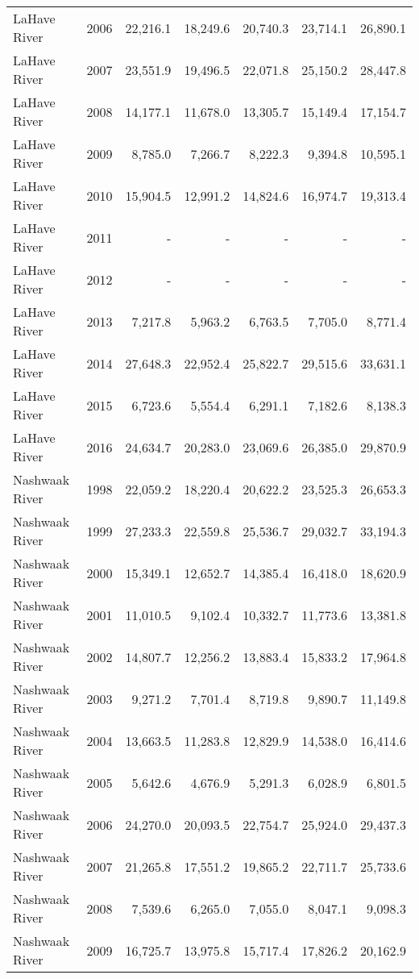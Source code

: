 \begin{longtable}{llrrrrr}
  LaHave River & 2006 & 22,216.1 & 18,249.6 & 20,740.3 & 23,714.1 & 26,890.1 \\ 
  LaHave River & 2007 & 23,551.9 & 19,496.5 & 22,071.8 & 25,150.2 & 28,447.8 \\ 
  LaHave River & 2008 & 14,177.1 & 11,678.0 & 13,305.7 & 15,149.4 & 17,154.7 \\ 
  LaHave River & 2009 & 8,785.0 & 7,266.7 & 8,222.3 & 9,394.8 & 10,595.1 \\ 
  LaHave River & 2010 & 15,904.5 & 12,991.2 & 14,824.6 & 16,974.7 & 19,313.4 \\ 
  LaHave River & 2011 & - & - & - & - & - \\ 
  LaHave River & 2012 & - & - & - & - & - \\ 
  LaHave River & 2013 & 7,217.8 & 5,963.2 & 6,763.5 & 7,705.0 & 8,771.4 \\ 
  LaHave River & 2014 & 27,648.3 & 22,952.4 & 25,822.7 & 29,515.6 & 33,631.1 \\ 
  LaHave River & 2015 & 6,723.6 & 5,554.4 & 6,291.1 & 7,182.6 & 8,138.3 \\ 
  LaHave River & 2016 & 24,634.7 & 20,283.0 & 23,069.6 & 26,385.0 & 29,870.9 \\ 
  Nashwaak River & 1998 & 22,059.2 & 18,220.4 & 20,622.2 & 23,525.3 & 26,653.3 \\ 
  Nashwaak River & 1999 & 27,233.3 & 22,559.8 & 25,536.7 & 29,032.7 & 33,194.3 \\ 
  Nashwaak River & 2000 & 15,349.1 & 12,652.7 & 14,385.4 & 16,418.0 & 18,620.9 \\ 
  Nashwaak River & 2001 & 11,010.5 & 9,102.4 & 10,332.7 & 11,773.6 & 13,381.8 \\ 
  Nashwaak River & 2002 & 14,807.7 & 12,256.2 & 13,883.4 & 15,833.2 & 17,964.8 \\ 
  Nashwaak River & 2003 & 9,271.2 & 7,701.4 & 8,719.8 & 9,890.7 & 11,149.8 \\ 
  Nashwaak River & 2004 & 13,663.5 & 11,283.8 & 12,829.9 & 14,538.0 & 16,414.6 \\ 
  Nashwaak River & 2005 & 5,642.6 & 4,676.9 & 5,291.3 & 6,028.9 & 6,801.5 \\ 
  Nashwaak River & 2006 & 24,270.0 & 20,093.5 & 22,754.7 & 25,924.0 & 29,437.3 \\ 
  Nashwaak River & 2007 & 21,265.8 & 17,551.2 & 19,865.2 & 22,711.7 & 25,733.6 \\ 
  Nashwaak River & 2008 & 7,539.6 & 6,265.0 & 7,055.0 & 8,047.1 & 9,098.3 \\ 
  Nashwaak River & 2009 & 16,725.7 & 13,975.8 & 15,717.4 & 17,826.2 & 20,162.9 \\ 

\end{longtable}
